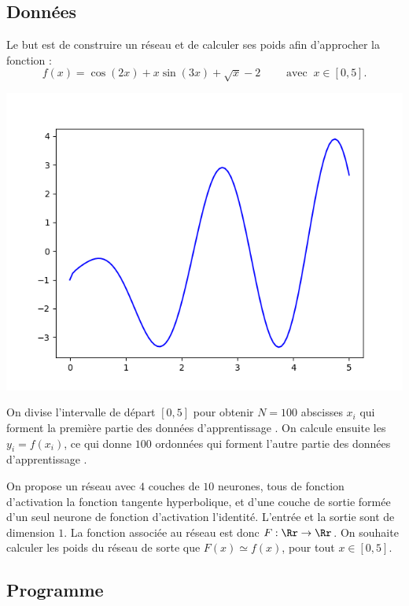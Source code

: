 \documentclass[11pt,class=report,crop=false]{standalone}
\begin{document}
\subsection{Données}

Le but est de construire un réseau et de calculer ses poids afin d'approcher la fonction :
$$f(x) = \cos(2x) + x \sin(3x) + \sqrt{x} - 2 \qquad \text{ avec } \  x \in[0,5].$$
\begin{center}
\includegraphics[scale=\myscale,scale=0.5]{figures/unevar-fonction}
\end{center}

On divise l'intervalle de départ $[0,5]$ pour obtenir $N=100$ abscisses $x_i$ qui forment la première partie des données d'apprentissage .
On calcule ensuite les $y_i = f(x_i)$, ce qui donne $100$ ordonnées qui forment l'autre partie des données d'apprentissage . 


On propose un réseau avec $4$ couches de $10$ neurones, tous de fonction d'activation la fonction tangente hyperbolique, et d'une couche de sortie formée d'un seul neurone de fonction d'activation l'identité.
L'entrée et la sortie sont de dimension $1$. 
La fonction associée au réseau est donc $F : \Rr \to \Rr$.
On souhaite calculer les poids du réseau de sorte que $F(x) \simeq f(x)$, pour tout $x\in[0,5]$.


\subsection{Programme}
\end{document}
